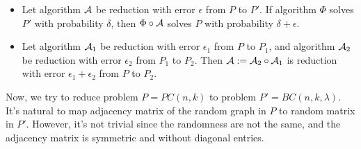 \begin{lem}
    \label{property_redu}
    \begin{itemize}
        \item  Let algorithm $\mathcal{A}$ be reduction with error $\epsilon$ from $P$ to $P'$. If algorithm $\Phi$ solves $P'$ with probability $\delta$, then $\Phi\circ\mathcal{A}$ solves $P$ with probability $\delta+\epsilon$.
        \item  Let algorithm $\mathcal{A}_1$ be reduction with error $\epsilon_1$ from $P$ to $P_1$, and algorithm $\mathcal{A}_2$ be reduction with error $\epsilon_2$ from $P_1$ to $P_2$. Then $\mathcal{A}:=\mathcal{A}_2\circ \mathcal{A}_1$ is reduction with error $\epsilon_1+\epsilon_2$ from $P$ to $P_2$.
    \end{itemize}
\end{lem}

Now, we try to reduce problem $P=PC(n,k)$ to problem $P'=BC(n,k,\lambda)$. 
It's natural to map adjacency matrix of the random graph in $P$ to random matrix in $P'$. 
However, it's not trivial since the randomness are not the same, and the adjacency matrix is symmetric and without diagonal entries.

